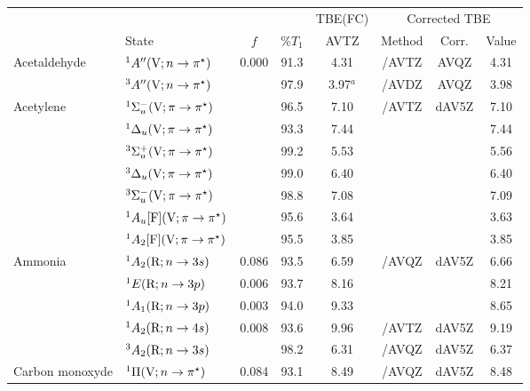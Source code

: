 \begin{tabular}{llcccccc}
                        &		&	&		& TBE(FC)&  \multicolumn{3}{c}{Corrected TBE} \\
                        & State	 & $f$ & \%$T_1$ & 	AVTZ	& Method & Corr.	& Value \\
      Acetaldehyde	&$^1A^{\prime\prime}(\mathrm{V};n \rightarrow \pi^\star)$					& 0.000	&91.3& 4.31		& {\exCI}/AVTZ & AVQZ		&4.31	\\
                        &$^3A^{\prime\prime}(\mathrm{V};n \rightarrow \pi^\star)$					&		&97.9& 3.97$^a$ 	& {\exCI}/AVDZ & AVQZ		&3.98	\\
      Acetylene		&$^1\Sigma_u^- (\mathrm{V};\pi \rightarrow \pi^\star)$ 			&		&96.5& 7.10		& {\exCI}/AVTZ & dAV5Z	 	&7.10 	\\
                        &$^1\Delta_u	(\mathrm{V};\pi \rightarrow \pi^\star)$ 			&		&93.3& 7.44		&			&			&7.44 	\\	
                        &$^3\Sigma_u^+ (\mathrm{V};\pi \rightarrow \pi^\star)$ 			&		&99.2& 5.53		&			&			&5.56 	\\	
                        &$^3\Delta_u	(\mathrm{V};\pi \rightarrow \pi^\star)$ 			&		&99.0& 6.40		&			&			&6.40 	\\	
                        &$^3\Sigma_u^- (\mathrm{V};\pi \rightarrow \pi^\star)$ 			&		&98.8& 7.08		&			&			&7.09 	\\	
                        &$^1A_u [\mathrm{F}]	(\mathrm{V};\pi \rightarrow \pi^\star)$	&		&95.6& 3.64		&			&			&3.63 	\\	
                        &$^1A_2 [\mathrm{F}]	(\mathrm{V};\pi \rightarrow \pi^\star)$	&		&95.5& 3.85		&			&			&3.85	\\	
      Ammonia		&$^1A_2 (\mathrm{R};n \rightarrow 3s)$ 						& 0.086	&93.5& 6.59		&{\exCI}/AVQZ & dAV5Z		&6.66 	\\
                        &$^1E (\mathrm{R};n \rightarrow 3p)$ 							& 0.006	&93.7& 8.16		&			&			&8.21	\\	
                        &$^1A_1 (\mathrm{R};n \rightarrow 3p)$ 						& 0.003	&94.0& 9.33		&			&			&8.65 	\\
                        &$^1A_2 (\mathrm{R};n \rightarrow 4s)$ 						& 0.008	&93.6& 9.96		&{\exCI}/AVTZ  & dAV5Z		&9.19 	\\
                        &$^3A_2 (\mathrm{R};n \rightarrow 3s)$ 						&		&98.2& 6.31		&{\exCI}/AVQZ & dAV5Z		&6.37	\\
      Carbon monoxyde	&$^1\Pi (\mathrm{V};n \rightarrow \pi^\star)$ 				& 0.084	&93.1 & 8.49		& {\exCI}/AVQZ& dAV5Z		&8.48	\\

\end{tabular}

